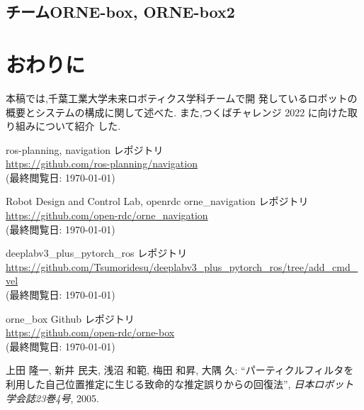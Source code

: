 \documentclass[uplatex, twocolumn, 9pt]{jsproceedings}
\begin{document}
\subsection{チームORNE-box, ORNE-box2}

\section{おわりに}
本稿では,千葉工業大学未来ロボティクス学科チームで開
発しているロボットの概要とシステムの構成に関して述べた.
また,つくばチャレンジ 2022 に向けた取り組みについて紹介
した.

\footnotesize
\begin{thebibliography}{99}

ros-planning, navigation レポジトリ\\
\url{https://github.com/ros-planning/navigation}\\
(最終閲覧日: \today)

Robot Design and Control Lab, openrdc orne\_navigation レポジトリ\\
\url{https://github.com/open-rdc/orne_navigation}\\
(最終閲覧日: \today)

deeplabv3\_plus\_pytorch\_ros レポジトリ\\
\url{https://github.com/Tsumoridesu/deeplabv3_plus_pytorch_ros/tree/add_cmd_vel}\\
(最終閲覧日: \today)

orne\_box Github レポジトリ\\
\url{https://github.com/open-rdc/orne-box}\\
(最終閲覧日: \today)

上田 隆一, 新井 民夫, 浅沼 和範, 梅田 和昇, 大隅 久: ``パーティクルフィルタを利用した自己位置推定に生じる致命的な推定誤りからの回復法'', \textit{日本ロボット学会誌23巻4号}, 2005.\\


\end{thebibliography}
\normalsize
\end{document}
